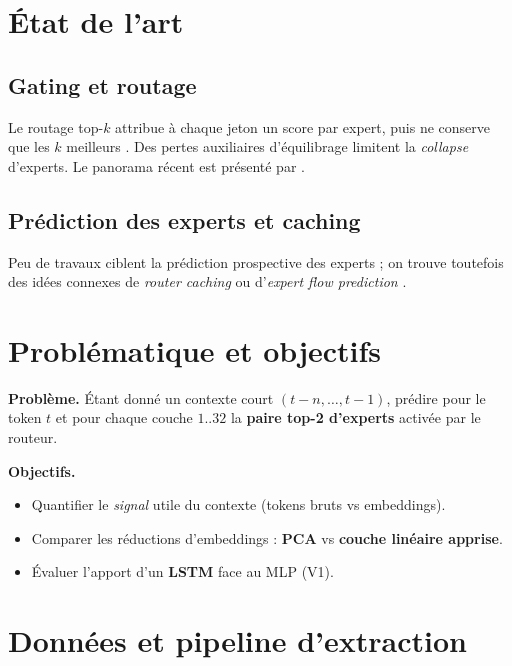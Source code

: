 \documentclass{article}
\begin{document}
\section{État de l'art}\label{sec:etat_art}

\subsection{Gating et routage}
Le routage top-$k$ attribue à chaque jeton un score par expert, puis ne conserve que les $k$ meilleurs \parencite{Shazeer2017, Lepikhin2020, Fedus2021, Du2022glam}. Des pertes auxiliaires d'équilibrage limitent la \emph{collapse} d'experts. Le panorama récent est présenté par \textcite{Cai2024}.

\subsection{Prédiction des experts et caching}
Peu de travaux ciblent la prédiction prospective des experts ; on trouve toutefois des idées connexes de \emph{router caching} ou d’\emph{expert flow prediction} \parencite{Rajbhandari2023DeepSpeedMoE, Kim2023expertflow}.

\section{Problématique et objectifs}

\textbf{Problème.} Étant donné un contexte court $(t\!-\!n,\dots,t\!-\!1)$, prédire pour le token $t$ et pour chaque couche $1..32$ la \textbf{paire top-2 d’experts} activée par le routeur.

\noindent
\textbf{Objectifs.}
\begin{itemize}
  \item Quantifier le \emph{signal} utile du contexte (tokens bruts vs embeddings).
  \item Comparer les réductions d'embeddings : \textbf{PCA} \parencite{Shlens2014} vs \textbf{couche linéaire apprise}.
  \item Évaluer l’apport d’un \textbf{LSTM} \parencite{Greff2015} face au MLP (V1).
\end{itemize}

\section{Données et pipeline d'extraction}
\end{document}
